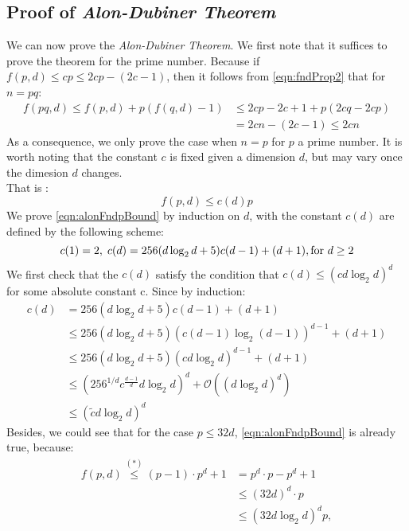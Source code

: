 \documentclass{article}
\theoremstyle{definition}
\numberwithin{equation}{theorem}
\numberwithin{figure}{theorem}
\newcommand{\alonDubinerTheorem}{\emph{Alon-Dubiner Theorem}}
\newcommand{\fnd}[2]{\ensuremath{f(#1,#2)}}
\newcommand{\bigO}[1]{\ensuremath{\mathcal{O}(#1)}}
\begin{document}
    \subsection{Proof of \alonDubinerTheorem}
    We can now prove the \alonDubinerTheorem{}. We first note that it suffices to prove the theorem
    for the prime number. Because if $\fnd{p}{d} \leq cp \leq 2cp - (2c - 1)$, then it follows from 
    \eqref{eqn:fndProp2} that for $n = pq$:
    \begin{align*}
        \fnd{pq}{d} \leq \fnd{p}{d} + p(\fnd{q}{d} - 1) &\leq 2cp - 2c + 1 + p (2cq - 2cp) \\
        &= 2cn - (2c - 1) \leq 2cn
    \end{align*}
    As a consequence, we only prove the case when $n = p$ for $p$ a prime number.
    It is worth noting that the constant $c$ is fixed given a dimension $d$, but may vary once the dimesion $d$ changes.\\
    That is :
    \begin{equation}\label{eqn:alonFndpBound}
        \fnd{p}{d}\leq c(d) p
    \end{equation}
    We prove \eqref{eqn:alonFndpBound} by induction on $d$, with the constant $c(d)$ are defined by the following scheme:
    \begin{equation}\label{eqn:alonCd_RecursiveForm}
        c(1) = 2, \; c(d) = 256(d\log_2 d + 5) c(d-1) + (d+1),\hfill \hbox{for } d\geq 2
    \end{equation}
    We first check that the $c(d)$ satisfy the condition that $c(d) \leq (cd\log_2 d)^d$ for some absolute constant c.
    Since by induction:
    \begin{align*}
        c(d) &= 256(d\log_2 d + 5) c(d-1) + (d+1) \\
            &\leq 256(d\log_2 d + 5) (c(d-1) \log_2 (d-1))^{d-1} + (d + 1)\\
            &\leq 256(d\log_2 d + 5) (cd \log_2 d)^{d-1} + (d + 1)\\
            & \leq (256^{1/d}c^{\frac{d-1}{d}} d \log_2 d)^{d} + \bigO{(d\log_2 d)^d}\\
            &\leq (\tilde{c}d\log_2 d)^d
    \end{align*}
    Besides, we could see that for the case $p \leq 32d$, \eqref{eqn:alonFndpBound} is already true, because:
    \begin{align*}
        \fnd{p}{d}\stackrel{(*)}{\leq} (p-1)\cdot p^d + 1 &= p^d \cdot p - p^d + 1\\
        &\leq (32d)^d \cdot p \\
        & \leq (32 d \log_2 d)^d p,
    \end{align*}
\end{document}
